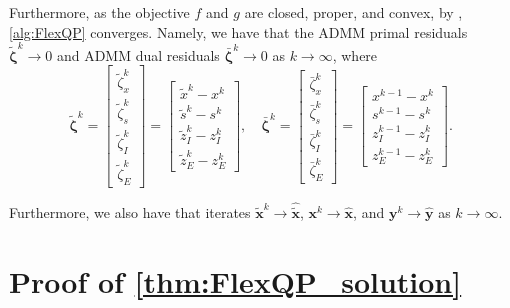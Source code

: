\documentclass{article} %
\begin{document}
Furthermore, as the objective $f$ and $g$ are closed, proper, and convex, by \citet[\S 3.2]{boyd2011distributed}, \cref{alg:FlexQP} converges. Namely, we have that the ADMM primal residuals $\tilde{\boldsymbol{\zeta}}^k \to 0$ and ADMM dual residuals $\bar{\boldsymbol{\zeta}}^k \to 0$ as $k \to \infty$, where
\begin{equation} \label{eq:admm_residuals}
    \tilde{\boldsymbol{\zeta}}^k = \begin{bmatrix}
        \tilde{\zeta}_x^k \\
        \tilde{\zeta}_s^k \\
        \tilde{\zeta}_I^k \\
        \tilde{\zeta}_E^k
    \end{bmatrix} = \begin{bmatrix}
        \tilde{x}^k - x^k \\
        \tilde{s}^k - s^k \\
        \tilde{z}_I^k - z_I^k \\
        \tilde{z}_E^k - z_E^k 
    \end{bmatrix}, \quad \bar{\boldsymbol{\zeta}}^k = \begin{bmatrix}
        \bar{\zeta}_x^k \\
        \bar{\zeta}_s^k \\
        \bar{\zeta}_I^k \\
        \bar{\zeta}_E^k
    \end{bmatrix} = \begin{bmatrix}
        x^{k - 1} - x^k \\
        s^{k - 1} - s^k \\
        z_I^{k - 1} - z_I^k \\
        z_E^{k - 1} - z_E^k 
    \end{bmatrix}.
\end{equation}

Furthermore, we also have that iterates $\tilde{\boldsymbol{x}}^k \to \hat{\tilde{\boldsymbol{x}}}$, $\boldsymbol{x}^k \to \hat{\boldsymbol{x}}$, and $\boldsymbol{y}^k \to \hat{\boldsymbol{y}}$ as $k \to \infty$.


\section{Proof of \cref{thm:FlexQP_solution}}
\label{appendix:proof_of_second_theorem}
\end{document}
